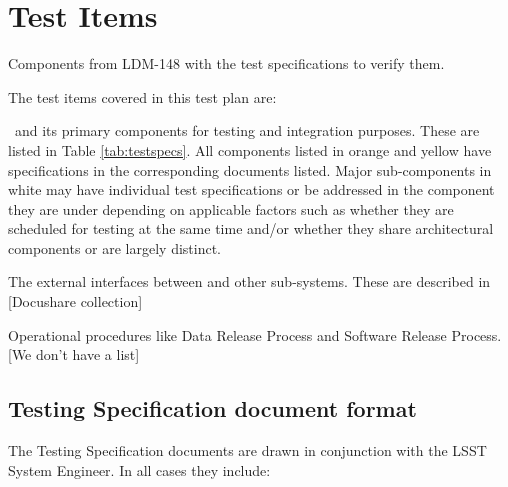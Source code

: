 \section{Test Items}

\begin{table}
	\caption{Components from LDM-148 with the test specifications to verify them. \label{tab:testspecs}}
	
\end{table}

The test items covered in this test plan are:

\begin{itemize_single}
\item \product \ and its primary components for testing and integration purposes. These are listed in Table \ref{tab:testspecs}. All components listed in orange and yellow have specifications in the corresponding documents listed. Major sub-components in white may have individual test specifications or be addressed in the component they are under depending on applicable factors such as whether they are scheduled for testing at the same time and/or whether they share architectural components or are largely distinct. 

\item The external interfaces between \product and other sub-systems. These are described in [Docushare collection]

\item Operational procedures like Data Release Process and Software Release Process. [We don't have a list]

\end{itemize_single}


  
\subsection{Testing Specification document format}

The Testing Specification documents are drawn in conjunction with the LSST System Engineer. In all cases they include:


